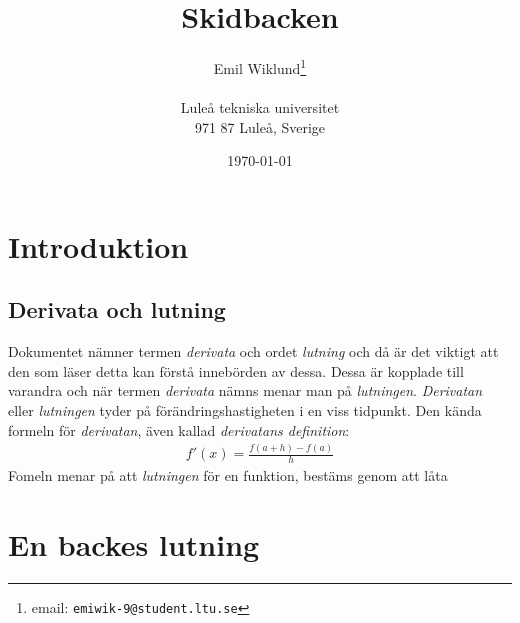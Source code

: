 \documentclass[a4paper,12pt]{article}
\title{Skidbacken}
\author{Emil Wiklund\thanks{email: \texttt{emiwik-9@student.ltu.se}}\\  
        ~ \\
        Luleå tekniska universitet \\ 
        971 87 Luleå, Sverige}
\date{\today}
\begin{document}
\linenumbers


\maketitle


\begin{abstract}

   
\end{abstract}


\section{Introduktion}
\label{sec:introduktion}





\subsection{Derivata och lutning}


Dokumentet nämner termen \emph{derivata} och ordet \emph{lutning} och då är det viktigt
att den som läser detta kan förstå innebörden av dessa. Dessa är kopplade till varandra och
när termen \emph{derivata }nämns menar man på \emph{lutningen}. \emph{Derivatan} eller
\emph{lutningen} tyder på förändringshastigheten i en viss tidpunkt. Den kända formeln för
\emph{derivatan}, även kallad \emph{derivatans definition}: 
%
\begin{align*}
  f'(x)=\frac{f(a+h)-f(a)}{h}
\end{align*}
%
Fomeln menar på att \emph{lutningen} för en funktion, bestäms genom att låta 


\newpage
\section{En backes lutning}
\label{sec:uppg1}
\end{document}
